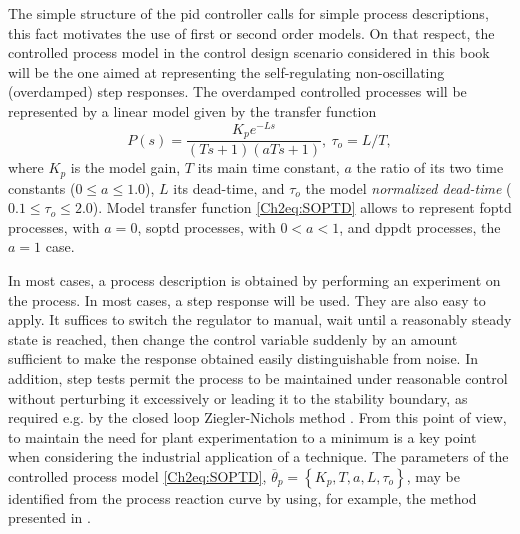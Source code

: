 The simple structure of the \gls{pid} controller calls for simple process descriptions, this fact motivates the use of first or second order models. On that respect, the controlled process model in the control design scenario considered in this book will be the one aimed at representing the self-regulating non-oscillating (overdamped) step responses. The overdamped controlled processes will be represented by a linear model given by the transfer function
%
\begin{equation}
    P(s) = \frac{K_p e^{-Ls}}{(Ts+1)(aTs+1)}, \ \tau_o = L/T, 
    \label{Ch2eq:SOPTD}
\end{equation}
%
where $K_p$ is the model gain, $T$ its main time constant, $a$ the ratio of its two time constants ($0 \leq a \leq 1.0$), $L$ its dead-time, and $\tau_o$ the model \emph{normalized dead-time} ($0.1 \leq \tau_o \leq 2.0$). Model transfer function \eqref{Ch2eq:SOPTD} allows to represent \gls{foptd} processes, with $a=0$, \gls{soptd} processes, with $0 < a < 1$, and \gls{dppdt} processes, the $a=1$ case.

In most cases, a process description is obtained by performing an experiment on the process. In most cases, a step response will be used. They are also easy to apply. It suffices to switch the regulator to manual, wait until a reasonably steady state is reached, then change the control variable suddenly by an amount sufficient to make the response obtained easily distinguishable from noise. In addition, step tests permit the process to be maintained under reasonable control without perturbing it excessively or leading it to the stability boundary, as required e.g. by the closed loop Ziegler-Nichols method \citep{astromhagglund2006}. From this point of view, to maintain the need for plant experimentation to a minimum is a key point when considering the industrial application of a technique. The parameters of the controlled process model \eqref{Ch2eq:SOPTD}, $\overline{\theta}_p = \left\{K_p, T, a, L, \tau_o \right\}$, may be identified from the process reaction curve by using, for example, the method presented in \citep{alfaro2006-1}. 




